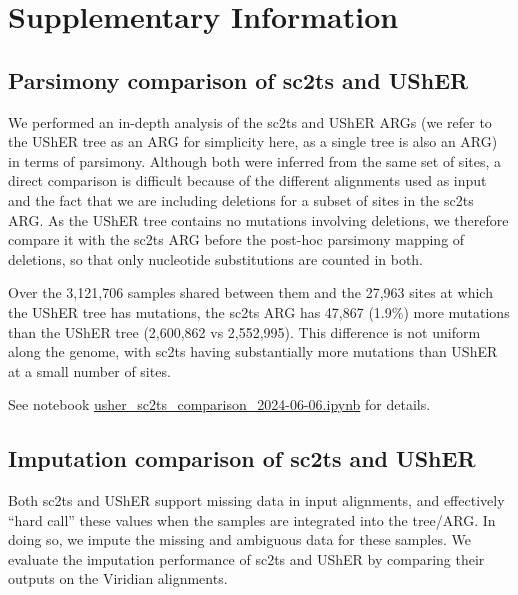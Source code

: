 \documentclass[12pt]{article}
\renewcommand{\figurename}{Fig.}
\begin{document}
\clearpage

\section*{Supplementary Information}
\appendix

\setcounter{table}{0}
\setcounter{figure}{0}
\renewcommand{\figurename}{Supplementary Fig.}
\renewcommand{\thefigure}{\arabic{figure}}
\renewcommand{\tablename}{Supplementary Table}
\renewcommand{\thetable}{\arabic{table}}
\renewcommand{\thesubsection}{\arabic{subsection}}

\subsection{Parsimony comparison of sc2ts and UShER}
\label{sec:supplement_sc2ts_usher_parsimony}

We performed an in-depth analysis of the sc2ts and UShER ARGs
(we refer to the UShER tree as an ARG for simplicity here,
as a single tree is also an ARG) in terms of parsimony.
Although both were inferred from the same set of sites,
a direct comparison is difficult because of
the different alignments used as input and
the fact that we are including deletions
for a subset of sites in the sc2ts ARG.
As the UShER tree contains no mutations involving deletions,
we therefore compare it with the sc2ts ARG before the post-hoc
parsimony mapping of deletions, so that only
nucleotide substitutions are counted in both.

Over the 3,121,706 samples shared between them and the 27,963 sites
at which the UShER tree has mutations, the sc2ts ARG has 47,867 (1.9\%) more
mutations than the UShER tree (2,600,862 vs 2,552,995).
This difference is not uniform along the genome, with
sc2ts having substantially more mutations than UShER
at a small number of sites.

See notebook
\href{https://github.com/jeromekelleher/sc2ts-paper/blob/main/arg\_postprocessing/logs/usher\_sc2ts\_comparison\_2024-06-06.ipynb}{usher\_sc2ts\_comparison\_2024-06-06.ipynb}
for details.


\subsection{Imputation comparison of sc2ts and UShER}
\label{sec:supplement_sc2ts_usher_imputation}

Both sc2ts and UShER support missing data in input alignments, and effectively
``hard call'' these values when the samples are integrated into the tree/ARG.
In doing so, we impute the missing and ambiguous data for these samples.
We evaluate the imputation performance of sc2ts and UShER by comparing their
outputs on the Viridian alignments.
\end{document}
